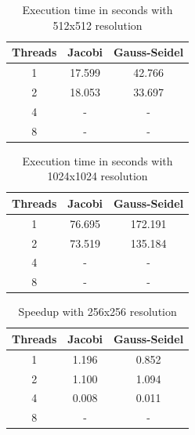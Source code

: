 \documentclass[titlepage]{article}
\begin{document}
\begin{table}[H]
\begin{center}
    \begin{tabular}{ |c|c|c| } 
     \hline
     \bfseries{Threads} & \bfseries{Jacobi} &
     \bfseries{Gauss-Seidel}\\
     \hline
     1 & 17.599  &  42.766 \\
     2 & 18.053 & 33.697 \\ 
     4 &  -  & -  \\ 
     8 &   - & -  \\ 
     \hline
    \end{tabular}
\end{center}
\caption{Execution time in seconds with 512x512 resolution}
\end{table}

\begin{table}[H]
\begin{center}
    \begin{tabular}{ |c|c|c| } 
     \hline
     \bfseries{Threads} & \bfseries{Jacobi} &
     \bfseries{Gauss-Seidel}\\
     \hline
     1 & 76.695 & 172.191 \\
     2 & 73.519 &  135.184\\ 
     4 & - & -  \\ 
     8 & - & -  \\ 
     \hline
    \end{tabular}
\end{center}
\caption{Execution time in seconds with 1024x1024 resolution}
\end{table}

\begin{table}[H]
\begin{center}
    \begin{tabular}{ |c|c|c| } 
     \hline
     \bfseries{Threads} & \bfseries{Jacobi} &
     \bfseries{Gauss-Seidel}\\
     \hline
     1 & 1.196 & 0.852  \\
     2 & 1.100 & 1.094  \\ 
     4 & 0.008 & 0.011 \\ 
     8 & - & -  \\ 
     \hline
    \end{tabular}
\end{center}
\caption{Speedup with 256x256 resolution}
\end{table}
\end{document}
